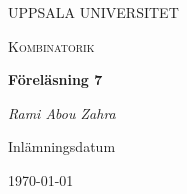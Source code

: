 \begin{titlepage}

  \centering
	{\scshape\LARGE UPPSALA UNIVERSITET\par}
	\vspace{1cm}
  {\scshape\Large {Kombinatorik} \par}
	\vspace{1.5cm}
  {\huge\bfseries {Föreläsning 7} \par}
	\vspace{2cm}
	{\Large\itshape Rami Abou Zahra \par}
	\vfill
  \vfill


  {\large Inlämningsdatum}\par
  {\today}

\end{titlepage}
